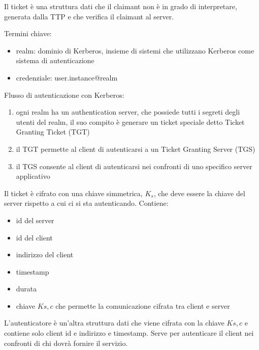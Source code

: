 \documentclass[11pt]{article}
\begin{document}
Il ticket è una struttura dati che il claimant non è in grado di interpretare, generata dalla TTP e che verifica il claimant 
al server.

Termini chiave: 
\begin{itemize}
    \item realm: dominio di Kerberos, insieme di sistemi che utilizzano Kerberos come sistema di autenticazione 
    \item credenziale: user.instance@realm
\end{itemize}

Flusso di autenticazione con Kerberos:
\begin{enumerate}
    \item ogni realm ha un authentication server, che possiede tutti i segreti degli utenti del realm, il suo compito è 
    generare un ticket speciale detto Ticket Granting Ticket (TGT)
    \item il TGT permette al client di autenticarsi a un Ticket Granting Server (TGS)
    \item il TGS consente al client di autenticarsi nei confronti di uno specifico server applicativo 
\end{enumerate}
Il ticket è cifrato con una chiave simmetrica, $K_s$, che deve essere la chiave del server rispetto a cui ci si sta autenticando.
Contiene:
\begin{itemize}
    \item id del server
    \item id del client 
    \item indirizzo del client  
    \item timestamp 
    \item durata 
    \item chiave $K{s,c}$ che permette la comunicazione cifrata tra client e server 
\end{itemize}
L'autenticatore è un'altra struttura dati che viene cifrata con la chiave $K{s,c}$ e contiene solo client id e indirizzo 
e timestamp. Serve per autenticare il client nei confronti di chi dovrà fornire il servizio.
\end{document}
